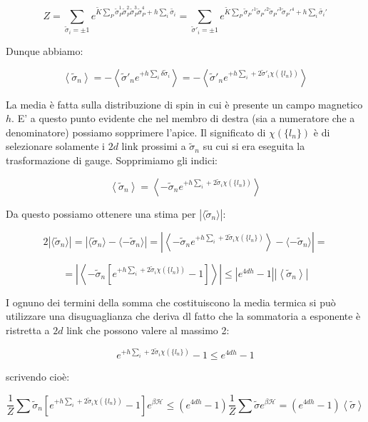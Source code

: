 \documentclass[12pt,a4paper]{article}
\begin{document}
\[
Z = \sum_{ {\tilde{\sigma}_i = \pm 1}} e^{\tilde{K} \sum_{P} \tilde{\sigma}_P^1 \tilde{\sigma}_P^2 \tilde{\sigma}_P^3 \tilde{\sigma}_P^4 + h \sum_{i} \tilde{\sigma_i}} = \sum_{ {\tilde{\sigma}'_i = \pm 1}} e^{\tilde{K} \sum_{P} \tilde{\sigma}_P'^1 \tilde{\sigma}_P'^2 \tilde{\sigma}_P'^3 \tilde{\sigma}_P'^4 + h \sum_{i} \tilde{\sigma_i}'}
\]

Dunque abbiamo:

\[
\left< \tilde{\sigma}_n \right> = - \left< \tilde{\sigma}'_n e^{+ h \sum_{i} \delta \tilde{\sigma}_i} \right> = - \left< \tilde{\sigma}'_n e^{+ h \sum_{i} + 2 \tilde{\sigma}'_i \chi( \lbrace l_n \rbrace )} \right>
\]

La media è fatta sulla distribuzione di spin in cui è presente un campo magnetico $h$. E' a questo punto evidente che nel membro di destra (sia a numeratore che a denominatore) possiamo sopprimere l'apice. Il significato di $\chi( \lbrace l_n \rbrace )$ è di selezionare solamente i $2d$ link prossimi a $\tilde{\sigma}_n$ su cui si era eseguita la trasformazione di gauge. Sopprimiamo gli indici:

\begin{equation}
\left< \tilde{\sigma}_n \right> = \left< - \tilde{\sigma}_n e^{+ h \sum_{i} + 2 \tilde{\sigma}_i \chi( \lbrace l_n \rbrace )} \right>
\end{equation}

Da questo possiamo ottenere una stima per $|\langle \tilde{\sigma}_n \rangle |$:

\[
2 |\langle \tilde{\sigma}_n \rangle | = | \langle \tilde{\sigma}_n \rangle - \langle - \tilde{\sigma}_n \rangle| = \left| \left< - \tilde{\sigma}_n e^{+ h \sum_{i} + 2 \tilde{\sigma}_i \chi( \lbrace l_n \rbrace )} \right> - \langle - \tilde{\sigma}_n \rangle \right| = 
\]

\[
= \left| \left< - \tilde{\sigma}_n \left[ e^{+ h \sum_{i} + 2 \tilde{\sigma}_i \chi( \lbrace l_n \rbrace )} - 1 \right] \right> \right| \leq \left| e^{4 d h} - 1 \right| \left| \left<  \tilde{\sigma}_n \right> \right| 
\]

I ognuno dei termini della somma che costituiscono la media termica si può utilizzare una disuguaglianza che deriva dl fatto che la sommatoria a esponente è ristretta a $2d$ link che possono valere al massimo 2:

\[
e^{+ h \sum_{i} + 2 \tilde{\sigma}_i \chi( \lbrace l_n \rbrace )} - 1 \leq e^{4dh} - 1
\]

scrivendo cioè:

\[
\frac{1}{Z} \sum \tilde{\sigma}_n \left[ e^{+ h \sum_{i} + 2 \tilde{\sigma}_i \chi( \lbrace l_n \rbrace )} - 1 \right] e^{\beta \mathcal{H}} \leq \left( e^{4dh} - 1 \right) \frac{1}{Z} \sum \tilde{\sigma} e^{\beta \mathcal{H}} = \left( e^{4dh} - 1 \right) \left< \tilde{\sigma} \right>
\]
\end{document}
